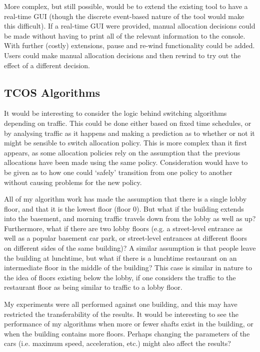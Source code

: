 \documentclass{UoYCSproject}
\begin{document}
More complex, but still possible, would be to extend the existing tool to have a real-time GUI (though the discrete event-based nature of the tool would make this difficult).  If a real-time GUI were provided, manual allocation decisions could be made without having to print all of the relevant information to the console.  With further (costly) extensions, pause and re-wind functionality could be added.  Users could make manual allocation decisions and then rewind to try out the effect of a different decision.

\subsection{TCOS Algorithms}

It would be interesting to consider the logic behind switching algorithms depending on traffic.  This could be done either based on fixed time schedules, or by analysing traffic as it happens and making a prediction as to whether or not it might be sensible to switch allocation policy.  This is more complex than it first appears, as some allocation policies rely on the assumption that the previous allocations have been made using the same policy.  Consideration would have to be given as to how one could `safely' transition from one policy to another without causing problems for the new policy.

All of my algorithm work has made the assumption that there is a single lobby floor, and that it is the lowest floor (floor 0).  But what if the building extends into the basement, and morning traffic travels down from the lobby as well as up?  Furthermore, what if there are two lobby floors (e.g. a street-level entrance as well as a popular basement car park, or street-level entrances at different floors on different sides of the same building)?  A similar assumption is that people leave the building at lunchtime, but what if there is a lunchtime restaurant on an intermediate floor in the middle of the building?  This case is similar in nature to the idea of floors existing below the lobby, if one considers the traffic to the restaurant floor as being similar to traffic to a lobby floor.

My experiments were all performed against one building, and this may have restricted the transferability of the results.  It would be interesting to see the performance of my algorithms when more or fewer shafts exist in the building, or when the building contains more floors.  Perhaps changing the parameters of the cars (i.e. maximum speed, acceleration, etc.) might also affect the results?
\end{document}
